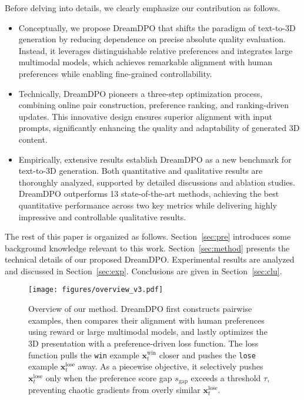 Before delving into details, we clearly emphasize our contribution as follows.
\begin{itemize}
    \item Conceptually, we propose DreamDPO that shifts the paradigm of text-to-3D generation by reducing dependence on precise absolute quality evaluation. Instead, it leverages distinguishable relative preferences and integrates large multimodal models, which achieves remarkable alignment with human preferences while enabling fine-grained controllability.
    \item Technically, DreamDPO pioneers a three-step optimization process, combining online pair construction, preference ranking, and ranking-driven updates. This innovative design ensures superior alignment with input prompts, significantly enhancing the quality and adaptability of generated 3D content.
    \item Empirically, extensive results establish DreamDPO as a new benchmark for text-to-3D generation. Both quantitative and qualitative results are thoroughly analyzed, supported by detailed discussions and ablation studies. DreamDPO outperforms 13 state-of-the-art methods, achieving the best quantitative performance across two key metrics while delivering highly impressive and controllable qualitative results.
\end{itemize}

The rest of this paper is organized as follows. Section~\ref{sec:pre} introduces some background knowledge relevant to this work. Section~\ref{sec:method} presents the technical details of our proposed DreamDPO. Experimental results are analyzed and discussed in Section~\ref{sec:exp}. Conclusions are given in Section~\ref{sec:clu}.



\begin{figure*}[t]
    \centering
    \texttt{[image: figures/overview\_v3.pdf]}
    \caption{Overview of our method.
    DreamDPO first constructs pairwise examples, then compares their alignment with human preferences using reward or large multimodal models, and lastly optimizes the 3D presentation with a preference-driven loss function. The loss function pulls the \texttt{win} example $\mathbf{x}_t^{\text{win}}$ closer and pushes the \texttt{lose} example $\mathbf{x}_t^{\text{lose}}$ away. 
    As a piecewise objective, it selectively pushes $\mathbf{x}_t^{\text{lose}}$ only when the preference score gap $s_\text{gap}$ exceeds a threshold $\tau$, preventing chaotic gradients from overly similar $\mathbf{x}_t^{\text{lose}}$.
    }
    \label{fig:overview}
\end{figure*}